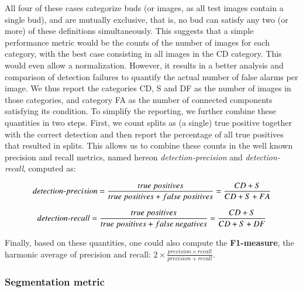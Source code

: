 \documentclass[a4paper,authoryear,review]{elsarticle}
\begin{document}
All four of these cases categorize buds (or images, as all test images contain a single bud), and are mutually exclusive, that is, no bud can satisfy any two (or more) of these definitions simultaneously. This suggests that a simple performance metric would be the counts of the number of images for each category, with the best case consisting in all images in the CD category. This would even allow a normalization. However, it results in a better analysis and comparison of detection failures to quantify the actual number of false alarms per image. We thus report the categories CD, S and DF as the number of images in those categories, and category FA as the number of connected components satisfying its condition.
To simplify the reporting, we further combine these quantities in two steps. First, we count splits as (a single) true positive together with the correct detection and then report the percentage of all true positives that resulted in splits. This allows us to combine these counts  in the well known precision and recall metrics, named hereon \emph{detection-precision} and \emph{detection-recall}, computed as:

\begin{equation}
detection \mbox{-} precision = \frac{true\ positives}{true\ positives+false\ positives} \\
= \frac{CD+S}{CD+S+FA}
\label{eq:detection-precision}
\end{equation}

\begin{equation}
detection \mbox{-} recall = \frac{true\ positives}{true\ positives+false\ negatives} \\
= \frac{CD+S}{CD+S+DF}
\label{eq:detection-recall}
\end{equation}

Finally, based on these quantities, one could also compute the \textbf{F1-measure}, the harmonic average of precision and recall: \( 2 \times \frac{precision \times recall}{precision + recall}\).

\subsubsection{Segmentation metric}
\end{document}
